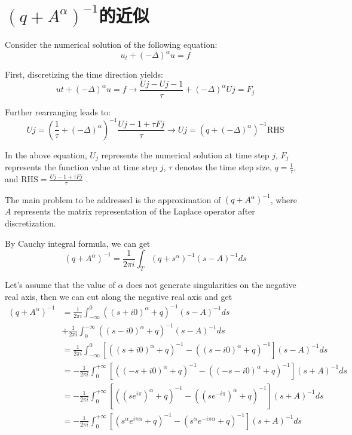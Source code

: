 \chapter{$(q+{A}^{\alpha})^{-1}$的近似}

Consider the numerical solution of the following equation:
\begin{equation}
	u_t + (-\Delta)^\alpha u = f
\end{equation}

First, discretizing the time direction yields:
\begin{equation}
	ut + (-\Delta)^\alpha u = f \rightarrow \frac{Uj - U{j-1}}{\tau} + (-\Delta)^\alpha Uj = F_j
\end{equation}

Further rearranging leads to:
\begin{equation}
	Uj = \left(\frac{1}{\tau} + (-\Delta)^\alpha\right)^{-1}\frac{U{j-1} + \tau Fj}{\tau} \rightarrow Uj = \left(q + (-\Delta)^\alpha\right)^{-1} \text{RHS}
\end{equation}

In the above equation, $U_j$ represents the numerical solution at time step $j$, $F_j$ represents the function value at time step $j$, $\tau$ denotes the time step size, $q = \frac{1}{\tau}$, and $\text{RHS}=\frac{U{j-1} + \tau Fj}{\tau}$ .

The main problem to be addressed is the approximation of $\left(q+A^\alpha\right)^{-1}$, where $A$ represents the matrix representation of the Laplace operator after discretization.

By Cauchy integral formula, we can get
\begin{equation}
(q+A^{\alpha})^{-1}=\frac{1}{2 \pi i} \int_T (q+s^{\alpha})^{-1}(s-A)^{-1} d s
\label{q+A_alpha}
\end{equation}

Let's assume that the value of $\alpha$ does not generate singularities on the negative real axis, then we can cut along the negative real axis and get
\begin{equation}
	\begin{aligned}
	(q+A^{\alpha})^{-1}&=\frac{1}{2\pi i}\int_{-\infty}^{0}((s+i 0)^{\alpha}+q)^{-1}(s-A)^{-1} d s\\&+\frac{1}{2 \pi i} \int_0^{-\infty}((s-i 0)^{\alpha}+q)^{-1}(s-A)^{-1} d s \\
	&=\frac{1}{2 \pi i} \int_{-\infty}^0[((s+i 0)^{\alpha}+q)^{-1}-((s-i 0)^{\alpha}+q)^{-1}](s-A)^{-1} d s\\
	&=-\frac{1}{2 \pi i} \int_{0}^{+\infty}[((-s+i 0)^{\alpha}+q)^{-1}-((-s-i 0)^{\alpha}+q)^{-1}](s+A)^{-1} d s\\
	&=-\frac{1}{2 \pi i} \int_{0}^{+\infty}[((se^{i \pi})^{\alpha}+q)^{-1}-((se^{-i \pi})^{\alpha}+q)^{-1}](s+A)^{-1} d s\\
	&=-\frac{1}{2 \pi i} \int_{0}^{+\infty}[(s^{\alpha}e^{i \pi \alpha}+q)^{-1}-(s^{\alpha}e^{-i \pi \alpha}+q)^{-1}](s+A)^{-1} d s\\
\end{aligned}
\end{equation}

